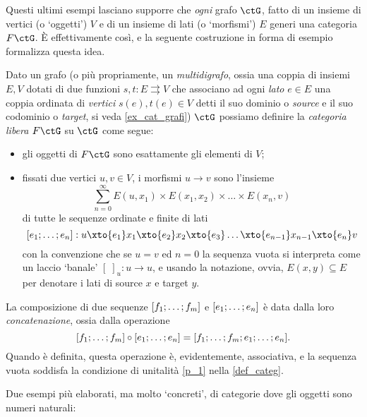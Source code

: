 Questi ultimi esempi lasciano supporre che \emph{ogni} grafo \(\ctG\), fatto di un insieme di vertici (o `oggetti') \(V\) e di un insieme di lati (o `morfismi') \(E\) generi una categoria \(F\ctG\). \`E effettivamente così, e la seguente costruzione in forma di esempio formalizza questa idea.
\begin{example}\label{ex_cat_libera}
	Dato un grafo (o più propriamente, un \emph{multidigrafo}, ossia una coppia di insiemi \(E,V\) dotati di due funzioni \(s,t : E\rightrightarrows V\) che associano ad ogni \emph{lato} \(e\in E\) una coppia ordinata di \emph{vertici} \(s(e),t(e)\in V\) detti il suo dominio o \emph{source} e il suo codominio o \emph{target}, si veda \ref{ex_cat_grafi}) \(\ctG\) possiamo definire la \emph{categoria libera} \(F\ctG\) su \(\ctG\) come segue:
	\begin{itemize}
		\item gli oggetti di \(F\ctG\) sono esattamente gli elementi di \(V\);
		\item fissati due vertici \(u,v\in V\), i morfismi \(u\to v\) sono l'insieme
		      \[\sum_{n=0}^\infty E(u,x_1)\times E(x_1,x_2)\times\dots\times E(x_n,v)\]
		      di tutte le sequenze ordinate e finite di lati
		      \[ [\tup en;] : u \xto{e_1} x_1 \xto{e_2} x_2\xto{e_3} \dots\xto{e_{n-1}} x_{n-1}\xto{e_n} v\]
		      con la convenzione che se \(u=v\) ed \(n=0\) la sequenza vuota si interpreta come un laccio `banale' \([\;]_u : u\to u\), e usando la notazione, ovvia, \(E(x,y)\subseteq E\) per denotare i lati di source \(x\) e target \(y\).
	\end{itemize}
	La composizione di due sequenze \([\tup fm;]\) e \([\tup en;]\) è data dalla loro \emph{concatenazione}, ossia dalla operazione
	\[[\tup fm;]\circ[\tup en;] = [\tup fm;;\tup en;].\]
	Quando è definita, questa operazione è, evidentemente, associativa, e la sequenza vuota soddisfa la condizione di unitalità \ref{p_1} nella \ref{def_categ}.
\end{example}
Due esempi più elaborati, ma molto `concreti', di categorie dove gli oggetti sono numeri naturali:
